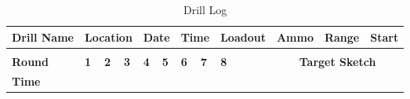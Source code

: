 \documentclass[../Cover.tex]{subfiles}
\begin{document}
\begin{table}[]
\caption{Drill Log}
\label{tab:my-table}
\begin{tabular}{|l|l|l|l|l|l|l|l|l|l|l|l|l|l|l|l|l|l|l|l|}
\hline
\multicolumn{3}{|l|}{\cellcolor[HTML]{329A9D}\textbf{Drill Name}} & \multicolumn{3}{l|}{\cellcolor[HTML]{329A9D}\textbf{Location}}                                               & \multicolumn{2}{l|}{\cellcolor[HTML]{329A9D}\textbf{Date}}              & \multicolumn{2}{l|}{\cellcolor[HTML]{329A9D}\textbf{Time}}              & \multicolumn{3}{l|}{\cellcolor[HTML]{329A9D}\textbf{Loadout}} & \multicolumn{3}{l|}{\cellcolor[HTML]{329A9D}\textbf{Ammo}} & \multicolumn{2}{l|}{\cellcolor[HTML]{329A9D}\textbf{Range}} & \multicolumn{2}{l|}{\cellcolor[HTML]{329A9D}\textbf{Start}} \\ \hline
\multicolumn{3}{|l|}{}                                            & \multicolumn{3}{l|}{}                                                                                        & \multicolumn{2}{l|}{}                                                   & \multicolumn{2}{l|}{}                                                   & \multicolumn{3}{l|}{}                                         & \multicolumn{3}{l|}{}                                      & \multicolumn{2}{l|}{}                                       & \multicolumn{2}{l|}{}                                       \\ \hline
\multicolumn{3}{|l|}{\cellcolor[HTML]{329A9D}\textbf{Round}}      & \cellcolor[HTML]{329A9D}\textbf{1} & \cellcolor[HTML]{329A9D}\textbf{2} & \cellcolor[HTML]{329A9D}\textbf{3} & \cellcolor[HTML]{329A9D}\textbf{4} & \cellcolor[HTML]{329A9D}\textbf{5} & \cellcolor[HTML]{329A9D}\textbf{6} & \cellcolor[HTML]{329A9D}\textbf{7} & \cellcolor[HTML]{329A9D}\textbf{8}        &         & \multicolumn{8}{c|}{\cellcolor[HTML]{329A9D}\textbf{Target Sketch}}                                                                                                                              \\ \cline{1-11} \cline{13-20} 
\multicolumn{3}{|l|}{\textbf{Time}}                               &                                    &                                    &                                    &                                    &                                    &                                    &                                    &                                           &         & \multicolumn{8}{l|}{}                                                                                                                                                                            \\ \cline{1-11}

\end{tabular}
\end{table}
\end{document}
